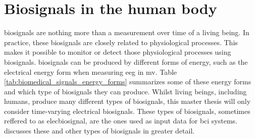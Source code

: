 
\section{Biosignals in the human body}
\label{sec:biomedical_signals_biosignals_in_human}

\Glspl{biosignal} are nothing more than a measurement over time of a living
being.
In practice, these \glspl{biosignal} are closely related to physiological processes.
This makes it possible to monitor or detect those physiological processes using \glspl{biosignal}.
\Glspl{biosignal} can be produced by different forms of energy, such as the electrical energy form when measuring \gls{eeg} in \gls{mv}.
Table \ref{tab:biomedical_signals_energy_forms} summarizes some of these energy forms and which type of \glspl{biosignal} they can produce.
Whilst living beings, including humans, produce many different types of \glspl{biosignal}, this master thesis will only consider time-varying electrical \glspl{biosignal}.
These types of \glspl{biosignal}, sometimes reffered to as \gls{elecbiosignal}, are the ones used as input data for \gls{bci} systems.
 discusses these and other types of \glspl{biosignal} in greater detail.

